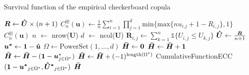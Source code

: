 \documentclass[12pt]{report}
\newcommand{\1}{\mathbf{1}}
\begin{document}
\begin{flushleft}
\begin{algorithm}[H]
\caption{Survival function of the empirical checkerboard copula}
\begin{algorithmic}
 
    \State $\boldsymbol{R} \gets \boldsymbol{\Hat{U}} \times (n + 1)$
    \State $C^{\boxplus}_{n}(\boldsymbol{u}) \gets \frac{1}{n}\sum\limits_{i = 1}^{n} \prod\limits_{j = 1}^{d} \mathrm{min}\{\mathrm{max}\{nu_{i.j} + 1 - R_{i,j}\}, 1\}$
    \State \Return $C^{\boxplus}_{n}(\boldsymbol{u})$
\EndProcedure
{}
    \State $n$ $\gets$ nrow($\boldsymbol{U}$)
    \State $d$ $\gets$ ncol($\boldsymbol{U}$)
            \State $\boldsymbol{R}_{i,j} \gets \sum\limits_{k = 1}^{n} \mathds{1} \{ U_{i,j} \le U_{k,j} \}$
        \EndFor
    \EndFor
    \State $\boldsymbol{\Hat{U}} \gets \frac{\boldsymbol{R}}{n + 1}$ 
    \State $\boldsymbol{u^{*}} \gets \boldsymbol{1} - \boldsymbol{\Hat{u}}$ 
    \State $\Omega \gets \mathrm{PowerSet}(1, \dots, d)$ 
    \State $\boldsymbol{\Bar{H}} \gets \boldsymbol{0}$ 
            \State $\boldsymbol{\Bar{H}} \gets \boldsymbol{\Bar{H}} + \boldsymbol{1}$
            \State $\boldsymbol{\Bar{H}} \gets \boldsymbol{\Bar{H}} - (\boldsymbol{1} - \boldsymbol{u}^{*}_{j \in \Omega^{*}})$ 
        \Else
            \State $\boldsymbol{\Bar{H}} \gets \boldsymbol{\Bar{H}} + (-1)^{\mathrm{length}(\Omega^{*})}$ CumulativeFunctionECC$(\boldsymbol{1} - \boldsymbol{u^{*}}_{j \in \Omega^{*}}, \boldsymbol{\Hat{U}^{*}}_{j \in \Omega^{*}}) $
        \EndIf
    \EndFor
    \State \Return $\boldsymbol{\Bar{H}}$
\EndProcedure
\end{algorithmic}
\end{algorithm}


\end{flushleft}
\end{document}
